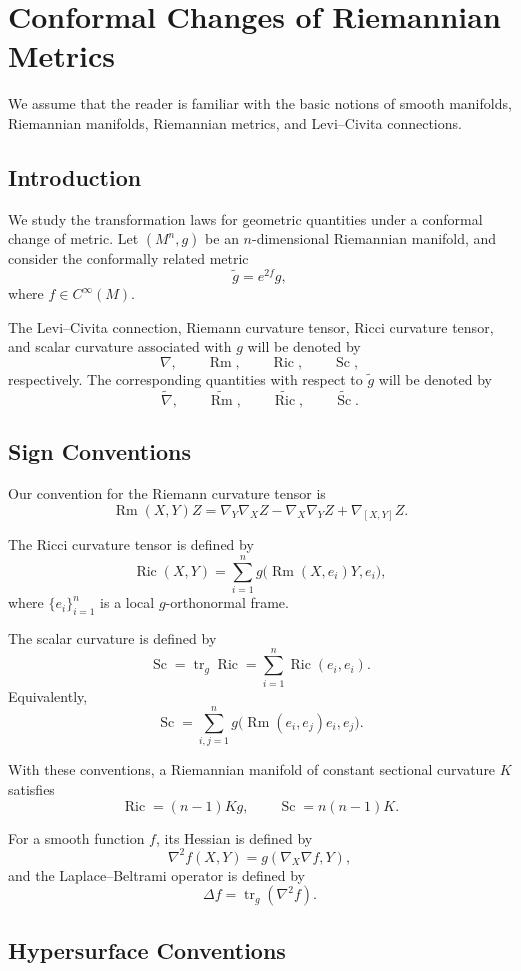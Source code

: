 \documentclass[11pt]{article}
\newcommand{\Tr}{\operatorname{tr}}
\newcommand{\Rm}{\operatorname{Rm}}
\newcommand{\Ric}{\operatorname{Ric}}
\newcommand{\Sc}{\operatorname{Sc}}
\begin{document}
\section{Conformal Changes of Riemannian Metrics}

We assume that the reader is familiar with the basic notions of smooth
manifolds, Riemannian manifolds, Riemannian metrics, and Levi--Civita
connections.

\subsection{Introduction}

We study the transformation laws for geometric quantities under a conformal
change of metric. Let \((M^n,g)\) be an \(n\)-dimensional Riemannian manifold,
and consider the conformally related metric
\[
\widetilde g=e^{2f}g,
\]
where \(f\in C^\infty(M)\).

The Levi--Civita connection, Riemann curvature tensor, Ricci curvature
tensor, and scalar curvature associated with \(g\) will be denoted by
\[
\nabla,\qquad
\Rm,\qquad
\Ric,\qquad
\Sc,
\]
respectively. The corresponding quantities with respect to
\(\widetilde g\) will be denoted by
\[
\widetilde{\nabla},\qquad
\widetilde{\Rm},\qquad
\widetilde{\Ric},\qquad
\widetilde{\Sc}.
\]

\subsection{Sign Conventions}

Our convention for the Riemann curvature tensor is
\[
\Rm(X,Y)Z
=
\nabla_Y\nabla_XZ
-
\nabla_X\nabla_YZ
+
\nabla_{[X,Y]}Z.
\]

The Ricci curvature tensor is defined by
\[
\Ric(X,Y)
=
\sum_{i=1}^n
g\bigl(\Rm(X,e_i)Y,e_i\bigr),
\]
where \(\{e_i\}_{i=1}^n\) is a local \(g\)-orthonormal frame.

The scalar curvature is defined by
\[
\Sc
=
\Tr_g\Ric
=
\sum_{i=1}^n \Ric(e_i,e_i).
\]
Equivalently,
\[
\Sc
=
\sum_{i,j=1}^n
g\bigl(\Rm(e_i,e_j)e_i,e_j\bigr).
\]

With these conventions, a Riemannian manifold of constant sectional
curvature \(K\) satisfies
\[
\Ric=(n-1)Kg,
\qquad
\Sc=n(n-1)K.
\]

For a smooth function \(f\), its Hessian is defined by
\[
\nabla^2f(X,Y)
=
g(\nabla_X\nabla f,Y),
\]
and the Laplace--Beltrami operator is defined by
\[
\Delta f
=
\Tr_g(\nabla^2f).
\]

\subsection{Hypersurface Conventions}
\end{document}
